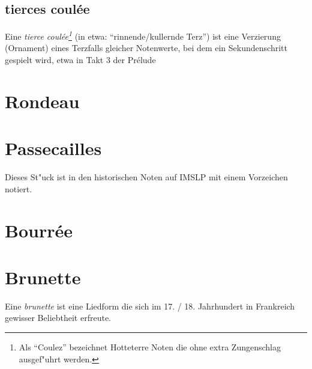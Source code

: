 \documentclass{notes}
\begin{document}
\begin{center}
\end{center}
\subsection{tierces coulée}
Eine \textit{tierce coulée\footnote{Als \enquote{Coulez} bezeichnet Hotteterre Noten die ohne extra Zungenschlag ausgef"uhrt werden.}} (in etwa: \enquote{rinnende/kullernde Terz}) ist
eine Verzierung (Ornament) eines Terzfalls gleicher Notenwerte, bei dem ein
Sekundenschritt gespielt wird, etwa in Takt 3 der Pr\'{e}lude
\begin{center}
\end{center}
\section{Rondeau}
\section{Passecailles}
Dieses St"uck ist in den historischen Noten auf IMSLP mit einem Vorzeichen notiert.
\section{Bourrée}
\section{Brunette}
Eine \textit{brunette} ist eine Liedform die sich im 17. / 18. Jahrhundert in
Frankreich gewisser Beliebtheit erfreute.
\end{document}
